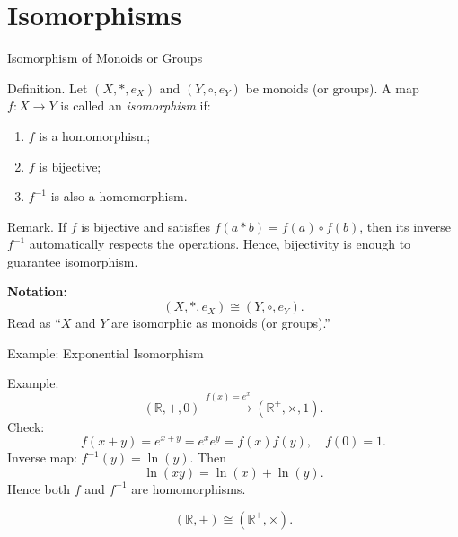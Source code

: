 \documentclass[11pt,aspectratio=43,ignorenonframetext,t]{beamer}
\begin{document}
\section{Isomorphisms}

\begin{frame}{Isomorphism of Monoids or Groups}
\vspace{-0.3cm}
\begin{block}{Definition.}  
Let $(X, *, e_X)$ and $(Y, \circ, e_Y)$ be monoids (or groups).  
A map \(f:X\to Y\) is called an \emph{isomorphism} if:
\begin{enumerate}
    \item \(f\) is a homomorphism;
    \item \(f\) is bijective;
    \item \(f^{-1}\) is also a homomorphism.
\end{enumerate}
\end{block}
\vspace{-0.3cm}
\begin{block}{Remark.}
If \(f\) is bijective and satisfies \(f(a*b)=f(a)\circ f(b)\), then its inverse \(f^{-1}\) automatically respects the operations.  
Hence, bijectivity is enough to guarantee isomorphism.

\textbf{Notation:}
\[
(X, *, e_X) \cong (Y, \circ, e_Y).
\]
Read as “\(X\) and \(Y\) are isomorphic as monoids (or groups).”
\end{block}
\end{frame}

\begin{frame}{Example: Exponential Isomorphism}
\vspace{-0.3cm}
\begin{block}{Example.}
\[
(\mathbb{R}, +, 0) \xrightarrow{\,f(x)=e^x\,} (\mathbb{R}^+, \times, 1).
\]
Check:
\[
f(x+y)=e^{x+y}=e^x e^y=f(x)f(y),\quad f(0)=1.
\]
Inverse map: \(f^{-1}(y)=\ln(y)\).  
Then
\[
\ln(xy)=\ln(x)+\ln(y).
\]
Hence both \(f\) and \(f^{-1}\) are homomorphisms.

\[
(\mathbb{R}, +) \cong (\mathbb{R}^+, \times).
\]
\end{block}
\end{frame}
\end{document}
